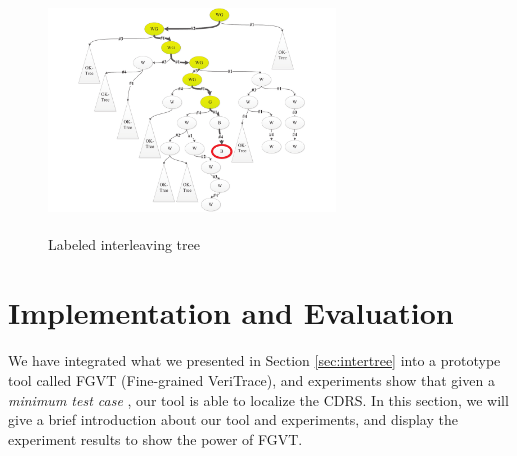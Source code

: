 \documentclass[runningheads]{llncs}
\begin{document}
\begin{figure}
\centering
\includegraphics[height = 2.5in, width = 3in]{psslabeltree.pdf}
\caption{Labeled interleaving tree}\label{fig:labeledinterleavingtreepss}
\end{figure}









\section{Implementation and Evaluation}\label{sec:implementation}
We have integrated what we presented in Section \ref{sec:intertree} into a prototype tool called FGVT (Fine-grained VeriTrace), and experiments show that given a \textit{minimum test case} \cite{DBLP:conf/seke/ZhangWZ17}, our tool is able to localize the CDRS. In this section, we will give a brief introduction about our tool and experiments, and display the experiment results to show the power of FGVT.
\end{document}
